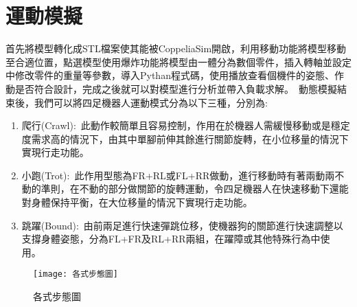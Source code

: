 \newpage

\section{運動模擬}
首先將模型轉化成STL檔案使其能被CoppeliaSim開啟，利用移動功能將模型移動至合適位置，點選模型使用爆炸功能將模型由一體分為數個零件，插入轉軸並設定中修改零件的重量等參數，導入Pythan程式碼，使用播放查看個機件的姿態、作動是否符合設計，完成之後就可以對模型進行分析並帶入負載求解。\
動態模擬結束後，我們可以將四足機器人運動模式分為以下三種，分別為:\
\begin{enumerate}
\item 爬行(Crawl):\
此動作較簡單且容易控制，作用在於機器人需緩慢移動或是穩定度需求高的情況下，由其中單腳前伸其餘進行關節旋轉，在小位移量的情況下實現行走功能。\
\item 小跑(Trot):\
此作用型態為FR+RL或FL+RR做動，進行移動時有著兩動兩不動的準則，在不動的部分做關節的旋轉運動，令四足機器人在快速移動下還能對身體保持平衡，在大位移量的情況下實現行走功能。\
\item 跳躍(Bound):\
由前兩足進行快速彈跳位移，使機器狗的關節進行快速調整以支撐身體姿態，分為FL+FR及RL+RR兩組，在躍障或其他特殊行為中使用。\
\end{enumerate}
\begin{figure}[hbt!]
\center
\texttt{[image: 各式步態圖]}
\caption{\Large 各式步態圖}\label{各式步態圖}
\end{figure}

\newpage
